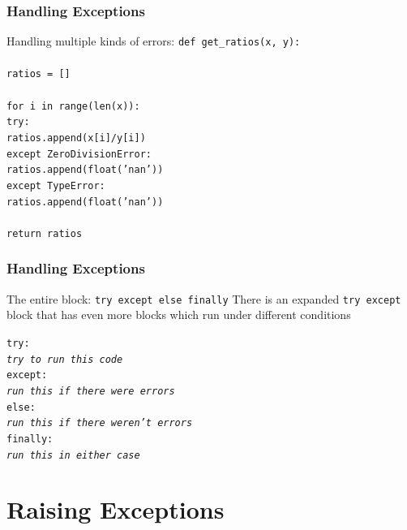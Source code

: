 \documentclass{beamer}
\newcommand{\code}[1]{\texttt{#1}}
\newcommand{\tab}{\hspace*{22pt}}
\begin{document}
\begin{frame}	
	\frametitle{Handling Exceptions}
	
	\begin{block}{Handling multiple kinds of errors:}
		\code{def get\_ratios(x, y): \\
				\tab \\
				\tab ratios = [] \\
				\tab \\
				\tab for i in range(len(x)): \\
				\tab \tab try: \\
				\tab \tab \tab ratios.append(x[i]/y[i]) \\
				\tab \tab except ZeroDivisionError: \\
				\tab \tab \tab ratios.append(float('nan')) \\
				\tab \tab except TypeError: \\
				\tab \tab \tab ratios.append(float('nan')) \\
				\tab \\
			    \tab return ratios
		}
	\end{block}
	
\end{frame}

\begin{frame}	
	\frametitle{Handling Exceptions}
	
	\begin{block}{The entire block: \code{try except else finally}}
		There is an expanded \code{try except} block that has even more blocks which run under different conditions
		
		\vspace{15pt}
		\code{try: \\
				\tab \emph{try to run this code} \\
				except: \\
				\tab \emph{run this if there were errors} \\
				else: \\
				\tab \emph{run this if there weren't errors} \\
				finally: \\
				\tab \emph{run this in either case} \\
		}
	\end{block}
	
\end{frame}


\section{Raising Exceptions}
\end{document}
